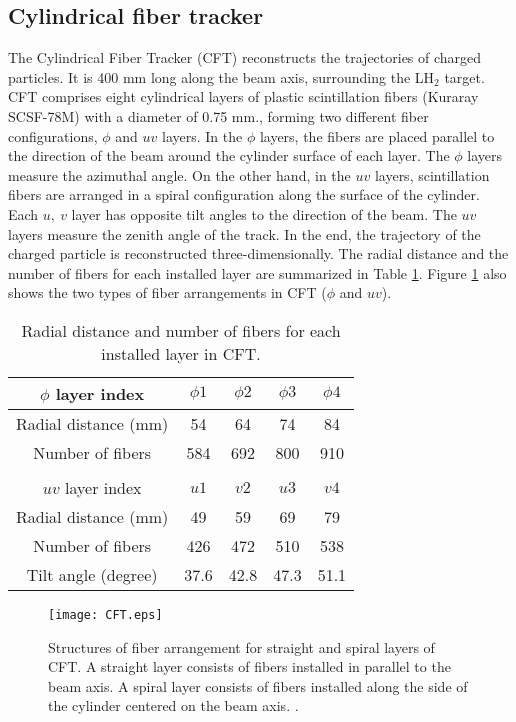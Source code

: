 \subsection{Cylindrical fiber tracker}
The Cylindrical Fiber Tracker (CFT) reconstructs the trajectories of charged particles. It is 400 mm long along the beam axis, surrounding the LH$_2$ target. CFT comprises eight cylindrical layers of plastic scintillation fibers (Kuraray SCSF-78M) with a diameter of 0.75 mm., forming two different fiber configurations, $\phi$ and $uv$ layers. In the $\phi$ layers, the fibers are placed parallel to the direction of the beam around the cylinder surface of each layer. The $\phi$ layers measure the azimuthal angle. On the other hand, in the $uv$ layers, scintillation fibers are arranged in a spiral configuration along the surface of the cylinder. Each $u,\ v$ layer has opposite tilt angles to the direction of the beam. The $uv$ layers measure the zenith angle of the track. In the end, the trajectory of the charged particle is reconstructed three-dimensionally. 
The radial distance and the number of fibers for each installed layer are summarized in Table \ref{tab-CFT}.
Figure \ref{fig-CFT} also shows the two types of fiber arrangements in CFT ($\phi$ and $uv$).

\begin{table}[h]
  \begin{center}
    \caption{Radial distance and number of fibers for each installed layer in CFT.}
    \begin{tabular}{ccccc} 
      $\phi$ layer index & $\phi1$ & $\phi2$ & $\phi3$ & $\phi4$ \\ \hline \hline
      Radial distance (mm) & 54 & 64 & 74 & 84 \\
      Number of fibers & 584 & 692 & 800 & 910 \\ 
      \\
      $uv$ layer index & $u1$ & $v2$ & $u3$ & $v4$ \\ \hline \hline
      Radial distance (mm) & 49 & 59 & 69 & 79 \\
      Number of fibers & 426 & 472 & 510 & 538 \\ 
      Tilt angle (degree) & 37.6 & 42.8 & 47.3 & 51.1 \\
   \end{tabular}
   \label{tab-CFT}
   \end{center}
\end{table}

\begin{figure}[!h]
 \begin{center}
   \texttt{[image: CFT.eps]}
   \caption{Structures of fiber arrangement for straight and spiral layers of CFT. A straight layer consists of fibers installed in parallel to the beam axis. A spiral layer consists of fibers installed along the side of the cylinder centered on the beam axis. \cite{Aka-2020}.}
   \label{fig-CFT}
 \end{center}
\end{figure}

